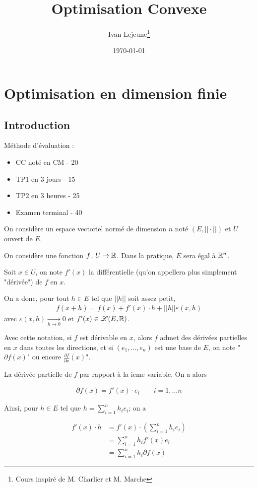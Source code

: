 \documentclass[french,a4paper,10pt]{article}
\title{\color{astral} \sffamily \bfseries Optimisation Convexe}
\author{Ivan Lejeune\thanks{Cours inspiré de M. Charlier et M. Marche}}
\date{\today}
\begin{document}
	
	\maketitle
	\section{Optimisation en dimension finie}
	\subsection{Introduction}
	Méthode d'évaluation :
	\begin{itemize}
		\item CC noté en CM - 20%
		\item TP1 en 3 jours - 15%
		\item TP2 en 3 heures - 25%
		\item Examen terminal - 40%
	\end{itemize}
	On considère un espace vectoriel normé de dimension $n$ noté $(E, ||\cdot||)$ et $U$ ouvert de $E$.
	
	On considère une fonction $f\colon U\to \mathbb{R}$. Dans la pratique, $E$ sera égal à $\mathbb{R}^n$.
	
	Soit $x\in U$, on note $f'(x)$ la différentielle (qu'on appellera plus simplement "dérivée") de $f$ en $x$. 
	
	On a donc, pour tout $h\in E$ tel que $||h||$ soit assez petit, 
		\[\begin{aligned}
			f(x+h)=f(x)+f'(x)\cdot h+||h||\varepsilon(x, h)
		\end{aligned}\]
		avec $\varepsilon(x, h)\underset{h\to 0}\to 0$
		et $f'(x)\in\mathscr{L}(E, \mathbb{R})$.
		
	Avec cette notation, si $f$ est dérivable en $x$, alors $f$ admet des dérivées partielles en $x$ dans toutes les directions, et si $(e_1,\dots,e_n)$ est une base de $E$, on note "$\partial f(x)$" ou encore $\frac{\partial f}{\partial x}(x)$".
	
	La dérivée partielle de $f$ par rapport à la ieme variable. On a alors
	
		\[\begin{aligned}
			\partial f(x)=f'(x)\cdot e_i\qquad i=1,\dots n
		\end{aligned}\]
	
	Ainsi, pour $h\in E$ tel que $h=\sum_{i=1}^nh_ie_i$; on a
	
		\[\begin{aligned}
			f'(x)\cdot h &= f'(x)\cdot\left(\sum_{i=1}^nh_ie_i\right)\\
			&=\sum_{i=1}^n h_i f'(x) e_i\\
			&=\sum_{i=1}^{n} h_i\partial f(x)
		\end{aligned}\]
	
\end{document}
